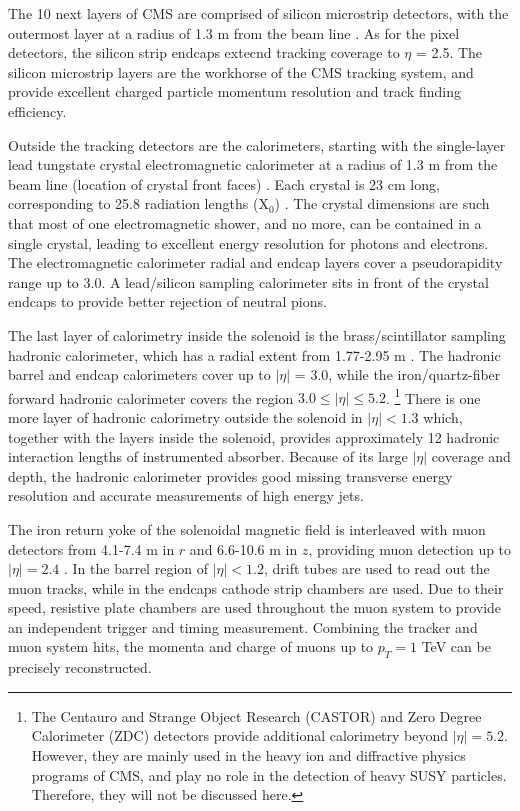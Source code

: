 \documentclass[dissertation.tex]{subfiles}
\begin{document}
The 10 next layers of CMS are comprised of silicon microstrip detectors, with the outermost layer at a radius of 1.3 m from the beam line \cite{CMS_detector_paper}.  As for the pixel detectors, the silicon strip endcaps extecnd tracking coverage to $\eta$ = 2.5.  The silicon microstrip layers are the workhorse of the CMS tracking system, and provide excellent charged particle momentum resolution and track finding efficiency.

Outside the tracking detectors are the calorimeters, starting with the single-layer lead tungstate crystal electromagnetic calorimeter at a radius of 1.3 m from the beam line (location of crystal front faces) \cite{CMS_detector_paper}.  Each crystal is 23 cm long, corresponding to 25.8 radiation lengths ($\mbox{X}_{0}$)  \cite{CMS_detector_paper}.  The crystal dimensions are such that most of one electromagnetic shower, and no more, can be contained in a single crystal, leading to excellent energy resolution for photons and electrons.  The electromagnetic calorimeter radial and endcap layers cover a pseudorapidity range up to 3.0.  A lead/silicon sampling calorimeter sits in front of the crystal endcaps to provide better rejection of neutral pions.

The last layer of calorimetry inside the solenoid is the brass/scintillator sampling hadronic calorimeter, which has a radial extent from 1.77-2.95 m \cite{CMS_detector_paper}.  The hadronic barrel and endcap calorimeters cover up to $|\eta|$ = 3.0, while the iron/quartz-fiber forward hadronic calorimeter covers the region $3.0 \leq |\eta| \leq 5.2$. \footnote{The Centauro and Strange Object Research (CASTOR) and Zero Degree Calorimeter (ZDC) detectors provide additional calorimetry beyond $|\eta| = 5.2$.  However, they are mainly used in the heavy ion and diffractive physics programs of CMS, and play no role in the detection of heavy SUSY particles.  Therefore, they will not be discussed here.}  There is one more layer of hadronic calorimetry outside the solenoid in $|\eta| < 1.3$ which, together with the layers inside the solenoid, provides approximately 12 hadronic interaction lengths of instrumented absorber.  Because of its large $|\eta|$ coverage and depth, the hadronic calorimeter provides good missing transverse energy resolution and accurate measurements of high energy jets.

The iron return yoke of the solenoidal magnetic field is interleaved with muon detectors from 4.1-7.4 m in $r$ and 6.6-10.6 m in $z$, providing muon detection up to $|\eta| = 2.4$ \cite{CMS_detector_paper}.  In the barrel region of $|\eta| < 1.2$, drift tubes are used to read out the muon tracks, while in the endcaps cathode strip chambers are used.  Due to their speed, resistive plate chambers are used throughout the muon system to provide an independent trigger and timing measurement.  Combining the tracker and muon system hits, the momenta and charge of muons up to $p_{T} = 1$ TeV can be precisely reconstructed.
\end{document}
